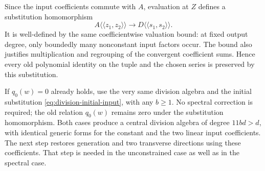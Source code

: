 Since the input coefficients commute with $A$, evaluation at $Z$
defines a substitution homomorphism
\[
 A\langle\!\langle z_1,z_2\rangle\!\rangle
 \longrightarrow D\langle\!\langle s_1,s_2\rangle\!\rangle.
\]
It is well-defined by the same coefficientwise valuation bound: at
fixed output degree, only boundedly many nonconstant input factors
occur.  The bound also justifies multiplication and regrouping of the
convergent coefficient sums.  Hence every old polynomial identity on
the tuple and the chosen series is preserved by this substitution.

If $q_0(w)=0$ already holds, use the very same division algebra and
the initial substitution \eqref{eq:division-initial-input}, with any
$b\ge1$.  No spectral correction is required; the old relation
$q_0(w)$ remains zero under the substitution homomorphism.  Both cases
produce a central division algebra of degree $11bd>d$, with identical
generic forms for the constant and the two linear input coefficients.
The next step restores generation and two transverse directions using
these coefficients.  That step is needed in the unconstrained case
as well as in the spectral case.
